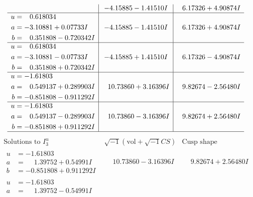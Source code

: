 \documentclass[1p]{elsarticle_modified}
\theoremstyle{definition}
\newcommand{\I}{\sqrt{-1}}
\begin{document}
$$\begin{array}{c|c|c}
 & -4.15885 - 1.41510 I & \phantom{-}6.17326 + 4.90874 I \\ \hline\begin{aligned}
u &= \phantom{-}0.618034\phantom{ +0.000000I} \\
a &= -3.10881 + 0.07733 I \\
b &= \phantom{-}0.351808 - 0.720342 I\end{aligned}
 & -4.15885 - 1.41510 I & \phantom{-}6.17326 + 4.90874 I \\ \hline\begin{aligned}
u &= \phantom{-}0.618034\phantom{ +0.000000I} \\
a &= -3.10881 - 0.07733 I \\
b &= \phantom{-}0.351808 + 0.720342 I\end{aligned}
 & -4.15885 + 1.41510 I & \phantom{-}6.17326 - 4.90874 I \\ \hline\begin{aligned}
u &= -1.61803\phantom{ +0.000000I} \\
a &= \phantom{-}0.549137 + 0.289903 I \\
b &= -0.851808 - 0.911292 I\end{aligned}
 & \phantom{-}10.73860 + 3.16396 I & \phantom{-}9.82674 - 2.56480 I \\ \hline\begin{aligned}
u &= -1.61803\phantom{ +0.000000I} \\
a &= \phantom{-}0.549137 - 0.289903 I \\
b &= -0.851808 + 0.911292 I\end{aligned}
 & \phantom{-}10.73860 - 3.16396 I & \phantom{-}9.82674 + 2.56480 I\\
 \hline 
 \end{array}$$\newpage$$\begin{array}{c|c|c}  
\text{Solutions to }I^u_{3}& \I (\text{vol} + \sqrt{-1}CS) & \text{Cusp shape}\\
 \hline 
\begin{aligned}
u &= -1.61803\phantom{ +0.000000I} \\
a &= \phantom{-}1.39752 + 0.54991 I \\
b &= -0.851808 + 0.911292 I\end{aligned}
 & \phantom{-}10.73860 - 3.16396 I & \phantom{-}9.82674 + 2.56480 I \\ \hline\begin{aligned}
u &= -1.61803\phantom{ +0.000000I} \\
a &= \phantom{-}1.39752 - 0.54991 I \\

\end{aligned}
\end{array}$$
\end{document}
